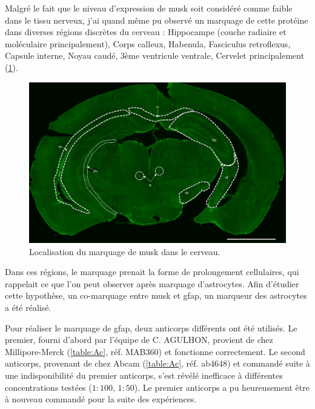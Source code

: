 	Malgré le fait que le niveau d'expression de \gls{musk} soit considéré comme faible dans le tissu nerveux, j'ai quand même pu observé un marquage de cette protéine dans diverses régions discrètes du cerveau : Hippocampe (couche radiaire et moléculaire principalement), Corps calleux, Habenula, Fasciculus retroflexus, Capsule interne, Noyau caudé, 3ème ventricule ventrale, Cervelet principalement (\cref{fig:ImmunoMusk}). 
	
	\begin{figure}[h] %
		\begin{center}
			\includegraphics[width=\textwidth]{./Images/Immuno/Musk/loca_MuSK.jpg}
		\end{center}
		\caption{Localisation du marquage de \gls{musk} dans le cerveau.}
		\label{fig:ImmunoMusk}
	\end{figure}
	
	Dans ces régions, le marquage prenait la forme de prolongement cellulaires, qui rappelait ce que l'on peut observer après marquage d'astrocytes. Afin d'étudier cette hypothèse, un co-marquage entre \gls{musk} et \gls{gfap}, un marqueur des astrocytes a été réalisé.
	
	Pour réaliser le marquage de \gls{gfap}, deux anticorps différents ont été utilisés. Le premier, fourni d'abord par l'équipe de C. AGULHON, provient de chez Millipore-Merck (\cref{table:Ac}, réf. MAB360) et fonctionne correctement. Le second anticorps, provenant de chez Abcam (\cref{table:Ac}, réf. ab4648) et commandé suite à une indisponibilité du premier anticorps, s'est révélé inefficace à différentes concentrations testées ($1{:}100$, $1{:}50$). Le premier anticorps a pu heureusement être à nouveau commandé pour la suite des expériences.
	
